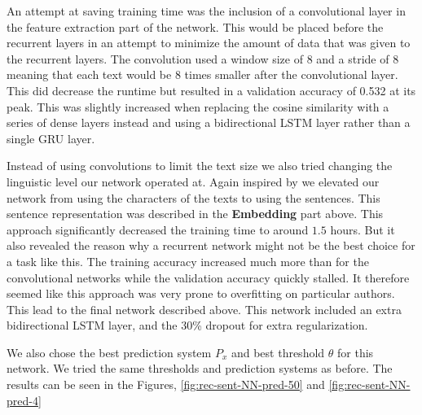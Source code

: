 An attempt at saving training time was the inclusion of a convolutional layer
in the feature extraction part of the network. This would be placed before the
recurrent layers in an attempt to minimize the amount of data that was given to
the recurrent layers. The convolution used a window size of 8 and a stride of 8
meaning that each text would be 8 times smaller after the convolutional layer.
This did decrease the runtime but resulted in a validation accuracy of 0.532
at its peak. This was slightly increased when replacing the cosine similarity
with a series of dense layers instead and using a bidirectional \gls{LSTM} layer
rather than a single \gls{GRU} layer.

Instead of using convolutions to limit the text size we also tried changing the
linguistic level our network operated at. Again inspired by \cite{qian:2018}
we elevated our network from using the characters of the texts to using the
sentences. This sentence representation was described in the \textbf{Embedding}
part above. This approach significantly decreased the training time to around
$1.5$ hours. But it also revealed the reason why a recurrent network might not
be the best choice for a task like this. The training accuracy increased much
more than for the convolutional networks while the validation accuracy quickly
stalled. It therefore seemed like this approach was very prone to overfitting on
particular authors. This lead to the final network described above. This network
included an extra bidirectional \gls{LSTM} layer, and the 30\% dropout for extra
regularization.

We also chose the best prediction system $P_x$ and best threshold $\theta$ for
this network. We tried the same thresholds and prediction systems as before.
The results can be seen in the Figures, \ref{fig:rec-sent-NN-pred-50} and
\ref{fig:rec-sent-NN-pred-4}

